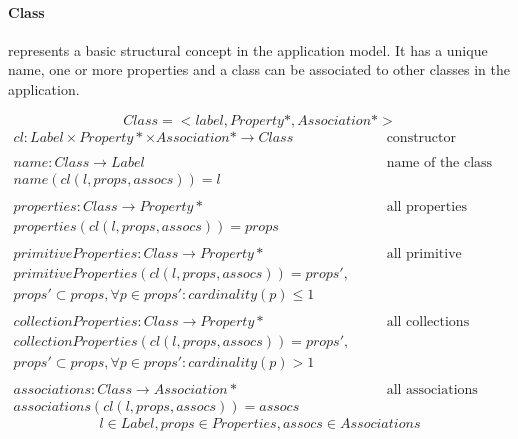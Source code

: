 \documentclass[11pt]{article}
\begin{document}
\paragraph{Class} represents a basic structural concept in the application model. It has a unique name, one or more properties and a class can be associated to other classes in the application. 

$$Class = <label, Property*, Association*>$$
\begin{equation*}
\begin{alignat}{2}
cl : Label \times Property* \times Association* \rightarrow Class &\quad&\text{constructor}\\ \\
name : Class \rightarrow Label &\quad&\text{name of the class}\\
name(cl(l, props, assocs)) = l \\ \\
properties : Class \rightarrow Property* &\quad&\text{all properties}\\
properties(cl(l, props, assocs)) = props \\ \\
primitiveProperties : Class \rightarrow Property* &\quad&\text{all primitive properties}\\
primitiveProperties(cl(l, props, assocs)) = props', \\ props' \subset props,  \forall p \in props' : cardinality(p) \leq 1 \\ \\
collectionProperties : Class \rightarrow Property* &\quad&\text{all collections}\\
collectionProperties(cl(l, props, assocs)) = props', \\ props' \subset props, \forall p \in props' : cardinality(p) > 1 \\ \\
associations : Class \rightarrow Association* &\quad&\text{all associations}\\
associations(cl(l, props, assocs)) = assocs
\end{alignat}
\end{equation*}
$$l \in Label, props \in Properties, assocs \in Associations$$
	 
\end{document}
